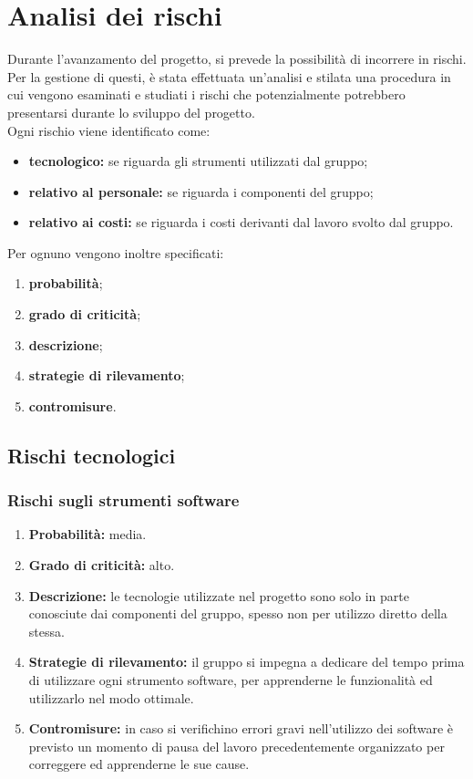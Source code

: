 \section{Analisi dei rischi}
Durante l'avanzamento del progetto, si prevede la possibilità di incorrere in rischi. Per la gestione di questi, è stata effettuata un'analisi e stilata una procedura in cui vengono esaminati e studiati i rischi che potenzialmente potrebbero presentarsi durante lo sviluppo del progetto. \\
Ogni rischio viene identificato come:
\begin{itemize}
\item \textbf{tecnologico:} se riguarda gli strumenti utilizzati dal gruppo;
\item \textbf{relativo al personale:} se riguarda i componenti del gruppo;
\item \textbf{relativo ai costi:} se riguarda i costi derivanti dal lavoro svolto dal gruppo.
\end{itemize}
Per ognuno vengono inoltre specificati:
\begin{enumerate}
	\item \textbf{probabilità};
	\item \textbf{grado di criticità};
	\item \textbf{descrizione};
	\item \textbf{strategie di rilevamento};
	\item \textbf{contromisure}.
\end{enumerate}

\subsection{Rischi tecnologici}
\subsubsection{Rischi sugli strumenti software}
\begin{enumerate}
	\item \textbf{Probabilità:} media.
	\item \textbf{Grado di criticità:} alto.
	\item \textbf{Descrizione:} le tecnologie utilizzate nel progetto sono solo in parte conosciute dai componenti del gruppo, spesso non per utilizzo diretto della stessa.
	\item \textbf{Strategie di rilevamento:} il gruppo si impegna a dedicare del tempo prima di utilizzare ogni strumento software, per apprenderne le funzionalità ed utilizzarlo nel modo ottimale.
	\item \textbf{Contromisure:} in caso si verifichino errori gravi nell'utilizzo dei software è previsto un momento di pausa del lavoro precedentemente organizzato per correggere ed apprenderne le sue cause.
\end{enumerate}

